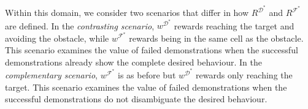 \documentclass[letterpaper]{article}
\newcommand{\jm}[1]{\textcolor{blue}{Joao: #1}}
\newcommand{\ks}[1]{\textcolor{green}{Kyriacos: #1}}
\newcommand{\jm}[1]{}
\newcommand{\ks}[1]{}
\begin{document}


Within this domain, we consider two scenarios that differ in how $R^{\mathcal{D}^*}$ and $R^{\mathcal{F}^*}$ are defined.  In the \emph{contrasting scenario}, $w^{\mathcal{D}^*}$ rewards reaching the target and avoiding the obstacle, while $w^{\mathcal{F}^*}$ rewards being in the same cell as the obstacle.  This scenario examines the value of failed demonstrations when the successful demonstrations already show the complete desired behaviour.  In the \emph{complementary scenario}, $w^{\mathcal{F}^*}$ is as before but $w^{\mathcal{D}^*}$ rewards only reaching the target. This scenario examines the value of failed demonstrations when the successful demonstrations do not disambiguate the desired behaviour.
\end{document}
